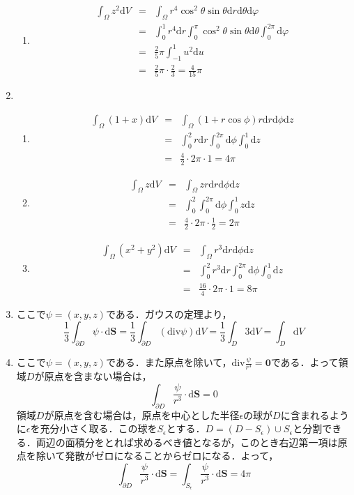 \documentclass{jarticle}
\def\d{\mathrm d}
\def\div{\mathrm{div}}
\begin{document}
\begin{enumerate}
\begin{enumerate}
        \item
          \begin{eqnarray*}
            \int_\Omega z^2 \d V & = & \int_\Omega r^4 \cos^2 \theta \sin \theta \d r \d \theta \d \varphi \\
            & = & \int_0^1 r^4 \d r \int_0^{\pi} \cos^2 \theta \sin \theta \d \theta \int_0^{2\pi} \d \varphi \\
            & = & \frac{2}{5} \pi \int_{-1}^{1} u^2 \d u \\
            & = & \frac{2}{5} \pi \cdot \frac{2}{3} = \frac{4}{15} \pi
          \end{eqnarray*}
      \end{enumerate}
    \item
      \begin{enumerate}
        \item
          \begin{eqnarray*}
            \int_\Omega (1+x) \d V & = & \int_\Omega (1+r \cos \phi) r \d r \d \phi \d z \\
            & = & \int_0^2 r \d r \int_0^{2\pi} \d \phi \int_0^1 \d z \\
            & = & \frac{4}{2} \cdot 2\pi \cdot 1 = 4 \pi
          \end{eqnarray*}
        \item
          \begin{eqnarray*}
            \int_\Omega z \d V & = & \int_\Omega z r \d r \d \phi \d z \\
            & = & \int_0^2 \int_0^{2\pi} \d \phi \int_0^1 z \d z \\
            & = & \frac{4}{2} \cdot 2\pi \cdot \frac{1}{2} = 2\pi
          \end{eqnarray*}
        \item
          \begin{eqnarray*}
            \int_\Omega (x^2+y^2) \d V & = & \int_\Omega r^3 \d r \d \phi \d z \\
            & = & \int_0^2 r^3 \d r \int_0^{2\pi} \d \phi \int_0^1 \d z \\
            & = & \frac{16}{4} \cdot 2\pi \cdot 1 = 8 \pi
          \end{eqnarray*}
      \end{enumerate}
    \item
      ここで$\psi=(x,y,z)$である．ガウスの定理より，
      \[ \frac{1}{3} \int_{\partial D} \psi \cdot \d \bm{S} = \frac{1}{3} \int_{\partial D} (\div \psi) \d V = \frac{1}{3} \int_D 3 \d V = \int_D \d V \]
    \item
      ここで$\psi=(x,y,z)$である．また原点を除いて，$\div \frac{\psi}{r^3} = \bm 0$である．よって領域$D$が原点を含まない場合は，
      \[ \int_{\partial D} \frac{\psi}{r^3} \cdot \d {\bm S} = 0 \]
      領域$D$が原点を含む場合は，原点を中心とした半径$\epsilon$の球が$D$に含まれるように$\epsilon$を充分小さく取る．この球を$S_\epsilon$とする．$D = (D - S_\epsilon) \cup S_\epsilon$と分割できる．両辺の面積分をとれば求めるべき値となるが，このとき右辺第一項は原点を除いて発散がゼロになることからゼロになる．よって，
      \[ \int_{\partial D} \frac{\psi}{r^3} \cdot \d {\bm S} = \int_{S_\epsilon} \frac{\psi}{r^3} \cdot \d {\bm S} = 4 \pi\]
  \end{enumerate}
\end{document}
